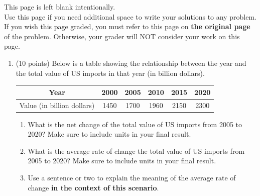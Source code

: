 \documentclass[11pt]{article}
\begin{document}
\vfill


\newpage 

This page is left blank intentionally.\\

Use this page if you need additional space to write your solutions to any problem. \\

If you wish this page graded, you must refer to this page on \textbf{the original page} of the problem. Otherwise, your grader will NOT consider your work on this page.

\newpage%


\begin{enumerate}


\item (10 points) Below is a table showing the relationship between the year and the total value of US imports in that year (in billion dollars).

\begin{table}[h!]
        \centering
        \begin{tabular}{|c|c|c|c|c|c|}
            \hline
            Year & 2000 & 2005 & 2010 & 2015 & 2020 \\
            \hline
            Value (in billion dollars) & 1450 & 1700 & 1960 & 2150 & 2300\\
            \hline
        \end{tabular}
    \end{table}

%

\begin{enumerate}
    \item What is the net change of the total value of US imports from 2005 to 2020? Make sure to include units in your final result.

    \vfill

    \item What is the average rate of change the total value of US imports from 2005 to 2020? Make sure to include units in your final result.

    \vfill

    \item Use a sentence or two to explain the meaning of the average rate of change \textbf{in the context of this scenario}. 
    

\end{enumerate}
\end{enumerate}
\end{document}

